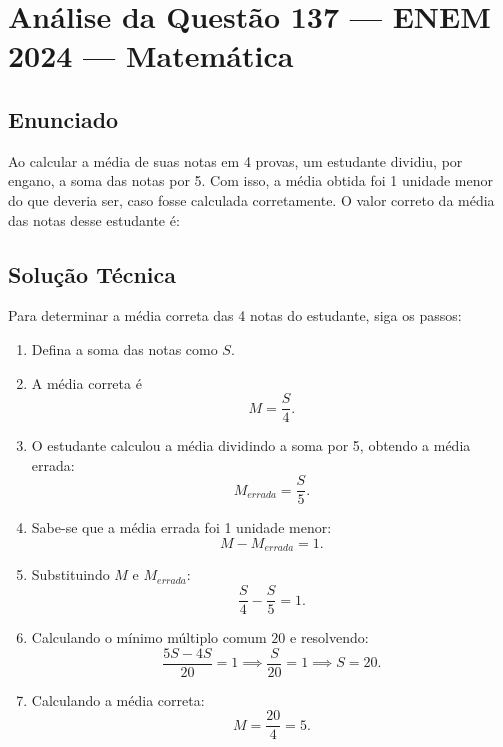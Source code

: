 \documentclass{article}
\begin{document}
\section*{Análise da Questão 137 — ENEM 2024 — Matemática}

\subsection*{Enunciado}
Ao calcular a média de suas notas em 4 provas, um estudante dividiu, por engano, a soma das notas por 5. Com isso, a média obtida foi 1 unidade menor do que deveria ser, caso fosse calculada corretamente. O valor correto da média das notas desse estudante é:

\subsection*{Solução Técnica}

Para determinar a média correta das 4 notas do estudante, siga os passos:

\begin{enumerate}
  \item Defina a soma das notas como $S$.
  \item A média correta é
  \begin{equation}
  M = \frac{S}{4}.
  \end{equation}
  \item O estudante calculou a média dividindo a soma por 5, obtendo a média errada:
  \begin{equation}
  M_{errada} = \frac{S}{5}.
  \end{equation}
  \item Sabe-se que a média errada foi 1 unidade menor:
  \begin{equation}
  M - M_{errada} = 1.
  \end{equation}
  \item Substituindo $M$ e $M_{errada}$:
  \begin{equation}
  \frac{S}{4} - \frac{S}{5} = 1.
  \end{equation}
  \item Calculando o mínimo múltiplo comum $20$ e resolvendo:
  \begin{equation}
  \frac{5S - 4S}{20} = 1 \implies \frac{S}{20} = 1 \implies S = 20.
  \end{equation}
  \item Calculando a média correta:
  \begin{equation}
  M = \frac{20}{4} = 5.
  \end{equation}
\end{enumerate}
\end{document}
